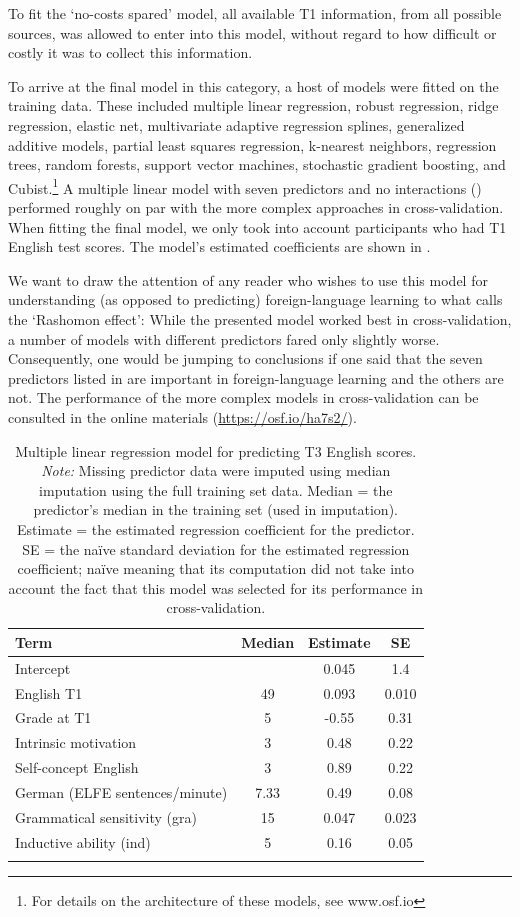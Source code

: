 \documentclass[output=paper]{langsci/langscibook}
\begin{document}
To fit the ‘no-costs spared’ model, all available T1 information, from all possible sources, was allowed to enter into this model, without regard to how difficult or costly it was to collect this information. 

To arrive at the final model in this category, a host of models were fitted on the training data. These included multiple linear regression, robust regression, ridge regression, elastic net, multivariate adaptive regression splines, generalized additive models, partial least squares regression, k-nearest neighbors, regression trees, random forests, support vector machines, stochastic gradient boosting, and Cubist.\footnote{For details on the architecture of these models, see www.osf.io} A multiple linear model with seven predictors and no interactions () performed roughly on par with the more complex approaches in cross-validation. When fitting the final model, we only took into account participants who had T1 English test scores. The model’s estimated coefficients are shown in . 

We want to draw the attention of any reader who wishes to use this model for understanding (as opposed to predicting) foreign-language learning to what \citet{Breiman2001} calls the ‘Rashomon effect’: While the presented model worked best in cross-validation, a number of models with different predictors fared only slightly worse. Consequently, one would be jumping to conclusions if one said that the seven predictors listed in  are important in foreign-language learning and the others are not. The performance of the more complex models in cross-validation can be consulted in the online materials (\url{https://osf.io/ha7s2/}).


\begin{table}
\caption{Multiple linear regression model for predicting T3 English scores. \emph{Note:} Missing predictor data were imputed using median imputation using the full training set data. Median = the predictor’s median in the training set (used in imputation). Estimate = the estimated regression coefficient for the predictor. SE = the naïve standard deviation for the estimated regression coefficient; naïve meaning that its computation did not take into account the fact that this model was selected for its performance in cross-validation.\label{tab:04:2}}
\begin{tabular}{l SSS}
\lsptoprule
 {Term} & {Median} & {Estimate} & {SE}\\\midrule
Intercept &  & 0.045 & 1.4\\
English T1 & 49 & 0.093 & 0.010\\
Grade at T1 & 5 & -0.55 & 0.31\\
Intrinsic motivation & 3 & 0.48 & 0.22\\
Self-concept English & 3 & 0.89 & 0.22\\
German (ELFE sentences/minute) & 7.33 & 0.49 & 0.08\\
Grammatical sensitivity (gra) & 15 & 0.047 & 0.023\\
Inductive ability (ind) & 5 & 0.16 & 0.05\\
\lspbottomrule
\end{tabular}
\end{table}
\end{document}
